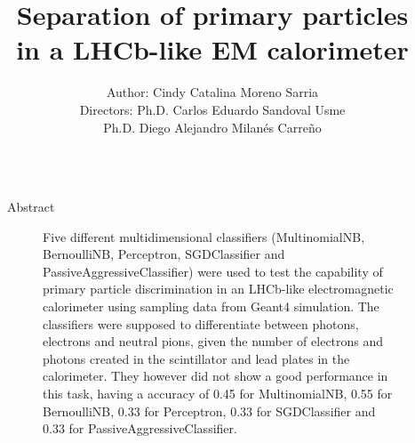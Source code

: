 \documentclass{beamer}
\title[Beamer Poster]{\huge{Separation of primary particles\\in a LHCb-like EM calorimeter}}
\author[ccatamorenos@gmail.com]{
Author: Cindy Catalina Moreno Sarria\\
Directors: Ph.D. Carlos Eduardo Sandoval Usme\\
Ph.D. Diego Alejandro Milanés Carreño
}
\institute[UNAL]
{
FENYX\\
Programa de Pregrado en Física
}
\date{}
\newlength{\sepwidthA} %
\newlength{\colwidthA} %
\newcommand{\separatorcolumnA}{\begin{column}{\sepwidthA}\end{column}}
\begin{document}
\begin{frame}{}


    \begin{columns}[t]
      \separatorcolumnA
      \begin{column}{\colwidthA}

        \begin{block}{Abstract}
          \begin{figure}
            {\small Five different multidimensional classifiers (MultinomialNB,
            BernoulliNB, Perceptron, SGDClassifier and
            PassiveAggressiveClassifier) were used to test the capability of
            primary particle discrimination in an LHCb-like electromagnetic
            calorimeter using sampling data from Geant4 simulation. The
            classifiers were supposed to differentiate between photons,
            electrons and neutral pions, given the number of electrons and
            photons created in the scintillator and lead plates in the
            calorimeter. They however did not show a good performance in this
            task, having a accuracy of 0.45 for MultinomialNB, 0.55 for
            BernoulliNB, 0.33 for Perceptron, 0.33 for SGDClassifier and 0.33
            for PassiveAggressiveClassifier.}
          \end{figure}
        \end{block}


\end{column}
\end{columns}
\end{frame}
\end{document}
